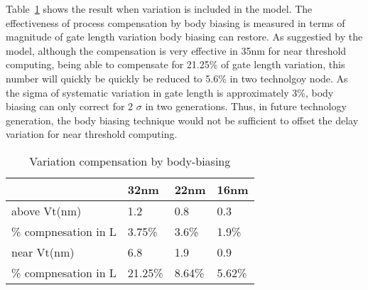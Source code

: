Table~\ref{compensation} shows the result when variation is included in the model. The effectiveness of process compensation by body biasing is measured in terms of magnitude of gate length variation body biasing can restore. As suggestied by the model, although the compensation is very effective in 35nm for near threshold computing, being able to compensate for 21.25\% of gate length variation, this number will quickly be quickly be reduced to 5.6\% in two technolgoy node. As the sigma of systematic variation in gate length is approximately 3\%, body biasing can only correct for 2 $\sigma$ in two generations. Thus, in future technology generation, the body biasing technique would not be sufficient to offset the delay variation for near threshold computing.    

\begin{table}
  \caption {Variation compensation by body-biasing}  
  \centering
  \label {compensation}
  \begin{tabular}{ | l | l | l | l | }
    \hline
    & 32nm & 22nm & 16nm \\ \hline
    above Vt(nm) & 1.2 & 0.8 & 0.3 \\ \hline
    \% compnesation in L  & 3.75\% & 3.6\% & 1.9\% \\ \hline
    near Vt(nm)  & 6.8 & 1.9 & 0.9\\  \hline
    \% compnesation in L & 21.25\% & 8.64\% & 5.62\% \\ 
    \hline
  \end{tabular}
\end{table}


